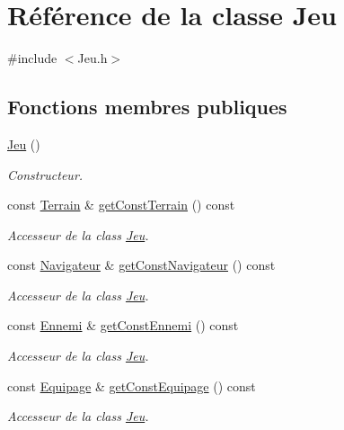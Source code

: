 \hypertarget{class_jeu}{}\section{Référence de la classe Jeu}
\label{class_jeu}


{\ttfamily \#include $<$Jeu.\+h$>$}

\subsection*{Fonctions membres publiques}
\begin{DoxyCompactItemize}
\item 
\hyperlink{class_jeu_acc5795ee00edf75516d3dfe65be3e6d6}{Jeu} ()
\begin{DoxyCompactList}\small\item\em Constructeur. \end{DoxyCompactList}\item 
const \hyperlink{class_terrain}{Terrain} \& \hyperlink{class_jeu_af7e7bd59e117f78b9d8623fd76230ca3}{get\+Const\+Terrain} () const
\begin{DoxyCompactList}\small\item\em Accesseur de la class \hyperlink{class_jeu}{Jeu}. \end{DoxyCompactList}\item 
const \hyperlink{class_navigateur}{Navigateur} \& \hyperlink{class_jeu_af2d070e73c6c9bd9dc3cf09d110a82eb}{get\+Const\+Navigateur} () const
\begin{DoxyCompactList}\small\item\em Accesseur de la class \hyperlink{class_jeu}{Jeu}. \end{DoxyCompactList}\item 
const \hyperlink{class_ennemi}{Ennemi} \& \hyperlink{class_jeu_a9266f571dc8cfacdf01e6f13d8a13568}{get\+Const\+Ennemi} () const
\begin{DoxyCompactList}\small\item\em Accesseur de la class \hyperlink{class_jeu}{Jeu}. \end{DoxyCompactList}\item 
const \hyperlink{class_equipage}{Equipage} \& \hyperlink{class_jeu_a8831cd95b6bf8984712e212a9db537cf}{get\+Const\+Equipage} () const
\begin{DoxyCompactList}\small\item\em Accesseur de la class \hyperlink{class_jeu}{Jeu}. \end{DoxyCompactList}\item 

\end{DoxyCompactItemize}
